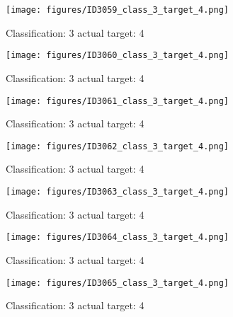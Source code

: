 \begin{figure}[h!]
\begin{center}
\texttt{[image: figures/ID3059\_class\_3\_target\_4.png]}
\end{center}
\caption{ Classification: 3 actual target: 4}
\label{fig:ID3059_class_3_target_4}
\end{figure}
\begin{figure}[h!]
\begin{center}
\texttt{[image: figures/ID3060\_class\_3\_target\_4.png]}
\end{center}
\caption{ Classification: 3 actual target: 4}
\label{fig:ID3060_class_3_target_4}
\end{figure}
\begin{figure}[h!]
\begin{center}
\texttt{[image: figures/ID3061\_class\_3\_target\_4.png]}
\end{center}
\caption{ Classification: 3 actual target: 4}
\label{fig:ID3061_class_3_target_4}
\end{figure}
\begin{figure}[h!]
\begin{center}
\texttt{[image: figures/ID3062\_class\_3\_target\_4.png]}
\end{center}
\caption{ Classification: 3 actual target: 4}
\label{fig:ID3062_class_3_target_4}
\end{figure}
\begin{figure}[h!]
\begin{center}
\texttt{[image: figures/ID3063\_class\_3\_target\_4.png]}
\end{center}
\caption{ Classification: 3 actual target: 4}
\label{fig:ID3063_class_3_target_4}
\end{figure}
\begin{figure}[h!]
\begin{center}
\texttt{[image: figures/ID3064\_class\_3\_target\_4.png]}
\end{center}
\caption{ Classification: 3 actual target: 4}
\label{fig:ID3064_class_3_target_4}
\end{figure}
\begin{figure}[h!]
\begin{center}
\texttt{[image: figures/ID3065\_class\_3\_target\_4.png]}
\end{center}
\caption{ Classification: 3 actual target: 4}
\label{fig:ID3065_class_3_target_4}
\end{figure}

